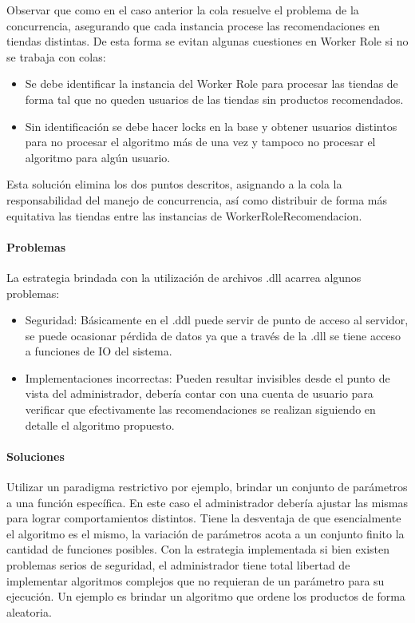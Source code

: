 \documentclass[journal]{IEEEtran}
\begin{document}
Observar que como en el caso anterior la cola resuelve el problema de la concurrencia, asegurando que cada instancia procese las recomendaciones en tiendas distintas. De esta forma se evitan algunas cuestiones en Worker Role si no se trabaja con colas:
\begin{itemize}
  \item Se debe identificar la instancia del Worker Role para procesar las tiendas de forma tal que no queden usuarios de las tiendas sin productos recomendados.    
  \item Sin identificación se debe hacer locks en la base y obtener     usuarios distintos para no procesar el algoritmo más de una vez y tampoco no procesar el algoritmo para algún usuario.
\end{itemize}

Esta solución elimina los dos puntos descritos, asignando a la cola la responsabilidad del manejo de concurrencia, así como distribuir de forma más equitativa las tiendas entre las instancias de WorkerRoleRecomendacion.

\paragraph{Problemas}
La estrategia brindada con la utilización de archivos .dll acarrea algunos problemas:
\begin{itemize}
  \item Seguridad: Básicamente en el .ddl puede servir de punto de acceso al servidor, se puede ocasionar pérdida de datos ya que a través de la .dll se tiene acceso a funciones de IO del sistema.
  \item Implementaciones incorrectas: Pueden resultar invisibles desde el punto de vista del administrador, debería contar con una cuenta de usuario para verificar que efectivamente las recomendaciones se realizan siguiendo en detalle el algoritmo propuesto.
\end{itemize}

\paragraph{Soluciones}
Utilizar un paradigma restrictivo por ejemplo, brindar un conjunto de parámetros a una función específica. En este caso el administrador debería ajustar las mismas para lograr comportamientos distintos. Tiene la desventaja de que esencialmente el algoritmo es el mismo, la variación de parámetros acota a un conjunto finito la cantidad de funciones posibles. Con la estrategia implementada si bien existen problemas serios de seguridad, el administrador tiene total libertad de implementar algoritmos complejos que no requieran de un parámetro para su ejecución. Un ejemplo es brindar un algoritmo que ordene los productos de forma aleatoria.
\end{document}
